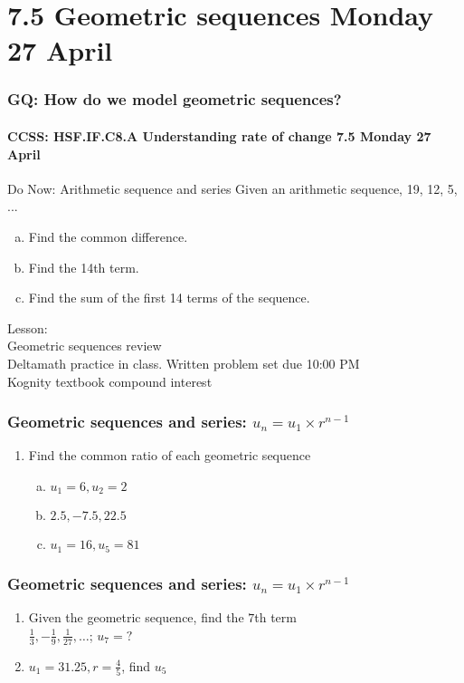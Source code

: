 \documentclass{beamer}
\begin{document}
\section{7.5 Geometric sequences \hfill Monday 27 April}
\frame
{
  \frametitle{GQ: How do we model geometric sequences?}
  \framesubtitle{CCSS: HSF.IF.C8.A Understanding rate of change \hfill \alert{7.5 Monday 27 April}}
  \begin{block}{Do Now: Arithmetic sequence and series}
      Given an arithmetic sequence, 19, 12, 5, ...
        \begin{enumerate}[(a)]
            \item Find the common difference.
            \item Find the 14th term.
            \item Find the sum of the first 14 terms of the sequence.
        \end{enumerate}
    \end{block}

    Lesson: \\
    Geometric sequences review \\
    Deltamath practice in class. Written problem set due 10:00 PM\\[0.25cm]
    Kognity textbook compound interest 
    }

\frame
{
  \frametitle{Geometric sequences and series: $u_n=u_1 \times r^{n-1}$}
  \begin{enumerate}
    \item Find the common ratio of each geometric sequence
      \begin{enumerate}[(a)]
          \item $u_1=6, u_2=2$ \vspace{1.5cm}
          \item $2.5, -7.5, 22.5$\vspace{2cm}
          \item $u_1=16, u_5=81$ \vspace{2cm}
      \end{enumerate}
    \end{enumerate}\vspace{5cm}
    }
    
\frame
{
  \frametitle{Geometric sequences and series: $u_n=u_1 \times r^{n-1}$}

  \begin{enumerate}
    \item Given the geometric sequence, find the $7$th term \\
          $\displaystyle \frac{1}{3}, -\frac{1}{9}, \frac{1}{27}, \dots$;  $u_7=?$ \vspace{2cm}
    \item $u_1=31.25, r=\frac{4}{5}$, find $u_5$ \vspace{2cm}
    \end{enumerate}\vspace{5cm}
    }
\end{document}
